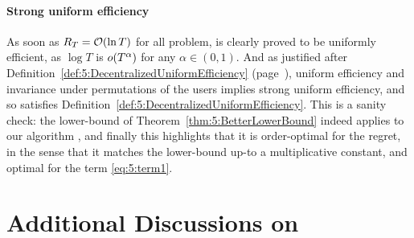 \paragraph{Strong uniform efficiency}\label{app:5:JustifyingDefinition5}
%
As soon as $R_T = \mathop{}\mathopen{}\mathcal{O}\mathopen{}\left(\ln T\right)$ for all problem, \MCTopM{} is clearly proved
to be uniformly efficient, as $\log T$ is $\mathop{}\mathopen{}o\mathopen{}\left(T^{\alpha}\right)$ for any $\alpha\in(0,1)$.
%
And as justified after Definition~\ref{def:5:DecentralizedUniformEfficiency} (page~\pageref{def:5:DecentralizedUniformEfficiency}), uniform efficiency and invariance under permutations of the users implies strong uniform efficiency, and so \MCTopM{} satisfies Definition~\ref{def:5:DecentralizedUniformEfficiency}.
%
This is a sanity check: the lower-bound of
Theorem~\ref{thm:5:BetterLowerBound} indeed applies to our algorithm \MCTopM,
and finally this highlights that it is order-optimal for the regret, in the sense that it matches the lower-bound up-to a multiplicative constant,
and optimal for the term \ref{eq:5:term1}.




\section{Additional Discussions on \Selfish}
\label{app:5:SelfishFails}


%
%
%
%

